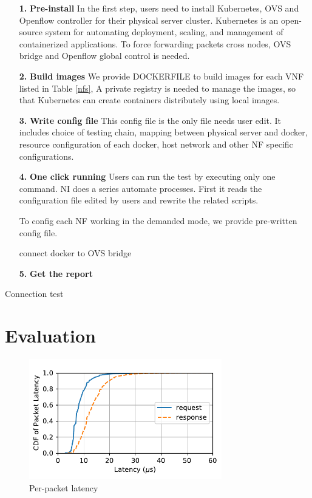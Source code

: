 \documentclass{sig-alternate-10pt}
\begin{document}
\begin{itemize}
\item[\textbf{1.}]{}\textbf{Pre-install} 
In the first step, users need to install Kubernetes, OVS 
and Openflow controller for their physical server cluster. 
Kubernetes is an open-source system for automating deployment, scaling, 
and management of containerized applications. 
To force forwarding packets cross nodes, 
OVS bridge and Openflow global control is needed. 

\item[\textbf{2.}]{}\textbf{Build images} 
We provide DOCKERFILE to build images for each VNF listed in Table \ref{nfs}, 
A private registry is needed to manage the images, 
so that Kubernetes can create containers distributely using local images.

\item[\textbf{3.}]{}\textbf{Write config file} 
This config file is the only file needs user edit. 
It includes choice of testing chain, 
mapping between physical server and docker,
resource configuration of each docker, 
host network and other NF specific configurations. 

\item[\textbf{4.}]{}\textbf{One click running} 
Users can run the test by executing only one command. 
NI does a series automate processes. 
First it reads the configuration file edited by users and rewrite the related scripts. 

To config each NF working in the demanded mode, 
we provide pre-written config file. 

connect docker to OVS bridge

\item[\textbf{5.}]{}\textbf{Get the report} 
\end{itemize}




Connection test 





\section{Evaluation}

\begin{figure}[t]
\label{cdf}
\centering
\includegraphics[width=3.3in]{cdf_chain1.pdf}
\caption{Per-packet latency}
\end{figure}
\end{document}

